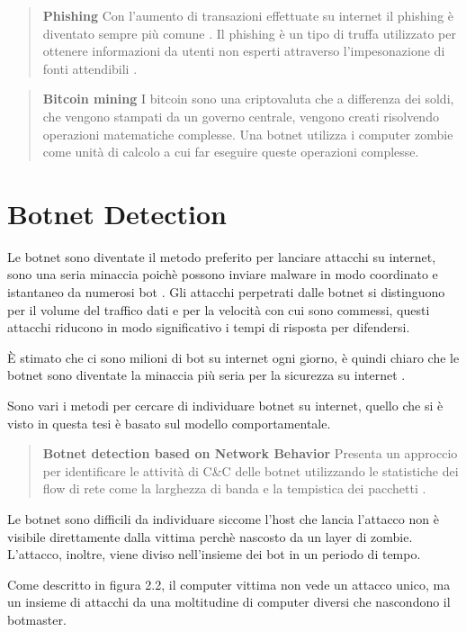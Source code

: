 \documentclass[../main.tex]{subfiles}
\begin{document}
\begin{verse}
				\textbf{Phishing} Con l'aumento di transazioni effettuate su internet il phishing è diventato sempre più comune \cite{phishing}. Il phishing è un tipo di truffa utilizzato per ottenere informazioni da utenti non esperti attraverso l'impesonazione di fonti attendibili \cite{phishingdef}.
\end{verse}

\begin{verse}
				\textbf{Bitcoin mining} I bitcoin sono una criptovaluta che a differenza dei soldi, che vengono stampati da un governo centrale, vengono creati risolvendo operazioni matematiche complesse. Una botnet utilizza i computer zombie come unità di calcolo a cui far eseguire queste operazioni complesse.
\end{verse}

\section{Botnet Detection}
Le botnet sono diventate il metodo preferito per lanciare attacchi su internet, sono una seria minaccia poichè possono inviare malware in modo coordinato e istantaneo da numerosi bot \cite{botnetdetection}.
Gli attacchi perpetrati dalle botnet si distinguono per il volume del traffico dati e per la velocità con cui sono commessi, questi attacchi riducono in modo significativo i tempi di risposta per difendersi.

È stimato che ci sono milioni di bot su internet ogni giorno, è quindi chiaro che le botnet sono diventate la minaccia più seria per la sicurezza su internet \cite{botnetdetection}.

Sono vari i metodi per cercare di individuare botnet su internet, quello che si è visto in questa tesi è basato sul modello comportamentale.
\begin{verse}
				\textbf{Botnet detection based on Network Behavior} Presenta un approccio per identificare le attività di C\&C delle botnet utilizzando le statistiche dei flow di rete come la larghezza di banda e la tempistica dei pacchetti \cite{botnetdetection}.
\end{verse}

Le botnet sono difficili da individuare siccome l'host che lancia l'attacco non è visibile direttamente dalla vittima perchè nascosto da un layer di zombie. L'attacco, inoltre, viene diviso nell'insieme dei bot in un periodo di tempo. 

Come descritto in figura 2.2, il computer vittima non vede un attacco unico, ma un insieme di attacchi da una moltitudine di computer diversi che nascondono il botmaster.
\end{document}
